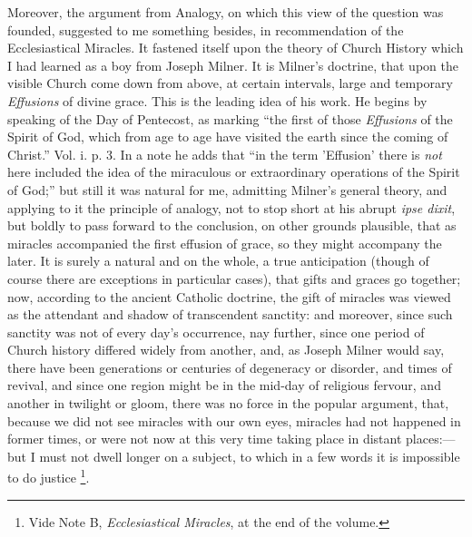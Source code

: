 Moreover, the argument from Analogy, on which this view of the
question was founded, suggested to me something besides, in
recommendation of the Ecclesiastical Miracles. It fastened itself upon
the theory of Church History which I had learned as a boy from Joseph
Milner. It is Milner's doctrine, that upon the visible Church come
down from above, at certain intervals, large and temporary \emph{Effusions} of divine grace. This is
the leading idea of his work. He begins by speaking of the Day of
Pentecost, as marking ``the first of those \emph{Effusions} of the
Spirit of God, which from age to age have visited the earth since the
coming of Christ.'' Vol. i. p. 3. In a note he adds that ``in the
term 'Effusion' there is \emph{not} here included the idea of the miraculous or extraordinary
operations of the Spirit of God;'' but still it was natural for me,
admitting Milner's general theory, and applying to it the principle of
analogy, not to stop short at his abrupt \emph{ipse dixit}, but boldly
to pass forward to the conclusion, on other grounds plausible, that
as miracles accompanied the first effusion of grace, so they might
accompany the later. It is surely a natural and on the whole, a true
anticipation (though of course there are exceptions in particular
cases), that gifts and graces go together; now, according to the
ancient Catholic doctrine, the gift of miracles was viewed as the
attendant and shadow of transcendent sanctity: and moreover, since such
sanctity was not of every day's occurrence, nay further, since one period
of Church history differed widely from another, and, as Joseph Milner would say, there have been generations or
centuries of degeneracy or disorder, and times of revival, and since one
region might be in the mid-day of religious fervour, and another in
twilight or gloom, there was no force in the popular argument, that,
because we did not see miracles with our own eyes, miracles had not
happened in former times, or were not now at this very time taking
place in distant places:—but I must not dwell longer on a
subject, to which in a few words it is impossible to do justice
\footnote{Vide Note
B, \emph{Ecclesiastical Miracles}, at the end of the volume.}.

